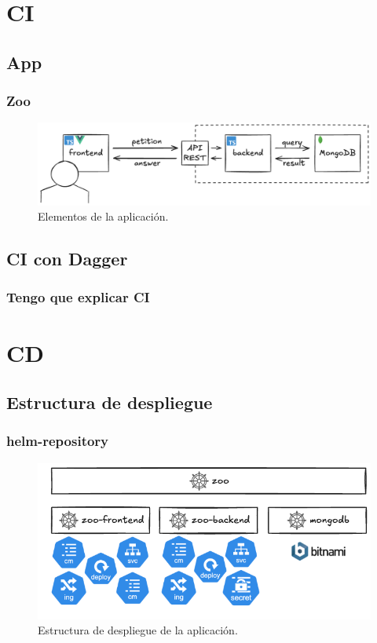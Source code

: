 \documentclass{beamer}
\begin{document}
\section{CI}
\subsection{App}
\begin{frame}
    \frametitle{Zoo}
    \begin{figure}
        \includegraphics[scale=0.25]{figuras/app}
        \caption{Elementos de la aplicación.}
    \end{figure}
\end{frame}

\subsection{CI con Dagger}
\begin{frame}
    \frametitle{Tengo que explicar CI}
\end{frame}

\section{CD}
\subsection{Estructura de despliegue}
\begin{frame}
    \frametitle{helm-repository}
    \begin{figure}
        \includegraphics[scale=0.4]{figuras/helm-repository}
        \caption{Estructura de despliegue de la aplicación.}
    \end{figure}
\end{frame}
\end{document}

